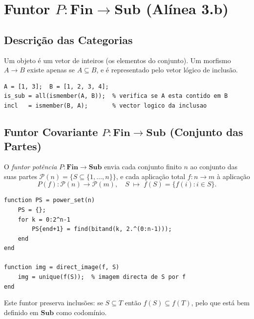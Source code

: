 \section{Funtor $P: \mathbf{Fin} \to \mathbf{Sub}$ (Alínea 3.b)}
\label{sec:functor-fin-sub}

\subsection{Descrição das Categorias}

\begin{definition}
Um objeto é um vetor de inteiros (os elementos do conjunto). Um morfismo $A \to B$ existe apenas se $A \subseteq B$, e é representado pelo vetor lógico de inclusão.
\end{definition}

\begin{lstlisting}[style=matlab, caption={Morfismo de inclusão em $\mathbf{Sub}$}]
A = [1, 3];  B = [1, 2, 3, 4];
is_sub = all(ismember(A, B));  % verifica se A esta contido em B
incl   = ismember(B, A);       % vector logico da inclusao
\end{lstlisting}

\subsection{Funtor Covariante $P: \mathbf{Fin} \to \mathbf{Sub}$ (Conjunto das Partes)}

O \emph{funtor potência} $P: \mathbf{Fin} \to \mathbf{Sub}$ envia cada conjunto finito $n$ ao conjunto das suas partes $\mathcal{P}(n) = \{S \subseteq \{1,\ldots,n\}\}$, e cada aplicação total $f: n \to m$ à aplicação
\[
    P(f): \mathcal{P}(n) \to \mathcal{P}(m), \quad S \;\longmapsto\; f(S) = \{f(i) : i \in S\}.
\]

\begin{lstlisting}[style=matlab, caption={Funtor potência $P$ e imagem direta}]
function PS = power_set(n)
    PS = {};
    for k = 0:2^n-1
        PS{end+1} = find(bitand(k, 2.^(0:n-1)));
    end
end

function img = direct_image(f, S)
    img = unique(f(S));  % imagem directa de S por f
end
\end{lstlisting}

\begin{remark}
Este funtor preserva inclusões: se $S \subseteq T$ então $f(S) \subseteq f(T)$, pelo que está bem definido em $\mathbf{Sub}$ como codomínio.
\end{remark}

